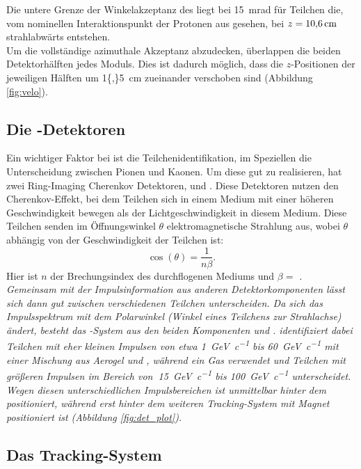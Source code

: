 Die untere Grenze der Winkelakzeptanz des \velo liegt bei \SI{15}{mrad} für Teilchen die, vom nominellen Interaktionspunkt der Protonen aus gesehen, bei $z=\SI{10{,}6}{cm}$ strahlabwärts entstehen.\\
Um die vollständige azimuthale Akzeptanz abzudecken, überlappen die beiden Detektorhälften jedes Moduls. Dies ist dadurch möglich, dass die $z$-Positionen der jeweiligen Hälften um \SI{1{,}5}{cm} zueinander verschoben sind (Abbildung \ref{fig:velo}).
 
\subsection{Die \rich-Detektoren}

Ein wichtiger Faktor bei \lhcb ist die Teilchenidentifikation, im Speziellen die Unterscheidung zwischen Pionen und Kaonen. Um diese gut zu realisieren, hat \lhcb zwei Ring-Imaging Cherenkov Detektoren, \richone und \richtwo. Diese Detektoren nutzen den Cherenkov-Effekt, bei dem Teilchen sich in einem Medium mit einer höheren Geschwindigkeit bewegen als der Lichtgeschwindigkeit in diesem Medium. Diese Teilchen senden im Öffnungswinkel $\theta$ elektromagnetische Strahlung aus, wobei $\theta$ abhängig von der Geschwindigkeit der Teilchen ist:
\begin{equation}
\cos\left(\theta\right)=\frac{1}{n\beta}.
\end{equation}
Hier ist $n$ der Brechungsindex des durchflogenen Mediums und $\beta=$ \itshape{}\upshape. \\ 
Gemeinsam mit der Impulsinformation aus anderen Detektorkomponenten lässt sich dann gut zwischen verschiedenen Teilchen unterscheiden. Da sich das Impulsspektrum mit dem Polarwinkel (Winkel eines Teilchens zur Strahlachse) ändert, besteht das \rich-System aus den beiden Komponenten \richone und \richtwo. \richone identifiziert dabei Teilchen mit eher kleinen Impulsen von etwa \SI{1}{GeV\per c} bis \SI{60}{GeV\per c} \cite{Alves:2008zz} mit einer Mischung aus Aerogel und \cfourften, während \richtwo ein \cffour Gas verwendet und Teilchen mit größeren Impulsen im Bereich von $~$\SI{15}{GeV\per c} bis \SI{100}{GeV\per c} \cite{Alves:2008zz} unterscheidet. Wegen diesen unterschiedlichen Impulsbereichen ist \richone unmittelbar hinter dem \velo positioniert, während \richtwo erst hinter dem weiteren Tracking-System mit Magnet positioniert ist (Abbildung \ref{fig:det_plot}). 

\subsection{Das Tracking-System}


